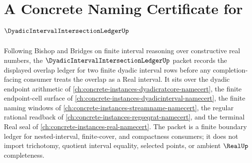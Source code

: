 \chapter{A Concrete Naming Certificate for $\DyadicIntervalIntersectionLedgerUp$}
\label{ch:concrete-instances-dyadic-interval-intersection-ledger-namecert}

Following Bishop and Bridges on finite interval reasoning over constructive real numbers, the $\DyadicIntervalIntersectionLedgerUp$ packet records the displayed overlap ledger for two finite dyadic interval rows before any completion-facing consumer treats the overlap as a Real interval. It sits over the dyadic endpoint arithmetic of \autoref{ch:concrete-instances-dyadicratcore-namecert}, the finite endpoint-cell surface of \autoref{ch:concrete-instances-dyadicinterval-namecert}, the finite naming windows of \autoref{ch:concrete-instances-streamname-namecert}, the regular rational readback of \autoref{ch:concrete-instances-regseqrat-namecert}, and the terminal Real seal of \autoref{ch:concrete-instances-real-namecert}. The packet is a finite boundary ledger for nested-interval, finite-cover, and compactness consumers; it does not import trichotomy, quotient interval equality, selected points, or ambient $\RealUp$ completeness.

